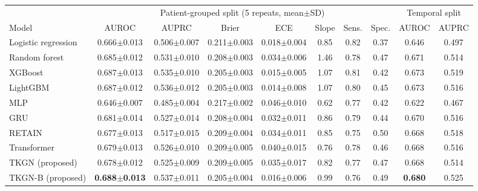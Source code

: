 \begin{tabular}{@{}lccccccc|cc@{}}
\toprule
 & \multicolumn{7}{c|}{Patient-grouped split (5 repeats, mean$\pm$SD)} & \multicolumn{2}{c}{Temporal split} \\
Model & AUROC & AUPRC & Brier & ECE & Slope & Sens. & Spec. & AUROC & AUPRC \\
\midrule
Logistic regression & 0.666$\pm$0.013 & 0.506$\pm$0.007 & 0.211$\pm$0.003 & 0.018$\pm$0.004 & 0.85 & 0.82 & 0.37 & 0.646 & 0.497 \\
Random forest & 0.685$\pm$0.012 & 0.531$\pm$0.010 & 0.208$\pm$0.003 & 0.034$\pm$0.006 & 1.46 & 0.78 & 0.47 & 0.671 & 0.514 \\
XGBoost & 0.687$\pm$0.013 & 0.535$\pm$0.010 & 0.205$\pm$0.003 & 0.015$\pm$0.005 & 1.07 & 0.81 & 0.42 & 0.673 & 0.519 \\
LightGBM & 0.687$\pm$0.012 & 0.536$\pm$0.012 & 0.205$\pm$0.003 & 0.014$\pm$0.008 & 1.07 & 0.80 & 0.45 & 0.673 & 0.516 \\
MLP & 0.646$\pm$0.007 & 0.485$\pm$0.004 & 0.217$\pm$0.002 & 0.046$\pm$0.010 & 0.62 & 0.77 & 0.42 & 0.622 & 0.467 \\
\midrule
GRU & 0.681$\pm$0.014 & 0.527$\pm$0.014 & 0.208$\pm$0.004 & 0.032$\pm$0.011 & 0.86 & 0.79 & 0.44 & 0.670 & 0.516 \\
RETAIN & 0.677$\pm$0.013 & 0.517$\pm$0.015 & 0.209$\pm$0.004 & 0.034$\pm$0.011 & 0.85 & 0.75 & 0.50 & 0.668 & 0.518 \\
Transformer & 0.679$\pm$0.013 & 0.526$\pm$0.010 & 0.209$\pm$0.005 & 0.040$\pm$0.015 & 0.76 & 0.78 & 0.46 & 0.668 & 0.516 \\
\midrule
TKGN (proposed) & 0.678$\pm$0.012 & 0.525$\pm$0.009 & 0.209$\pm$0.005 & 0.035$\pm$0.017 & 0.82 & 0.77 & 0.47 & 0.668 & 0.514 \\
TKGN-B (proposed) & \textbf{0.688$\pm$0.013} & 0.537$\pm$0.011 & 0.205$\pm$0.004 & 0.016$\pm$0.006 & 0.99 & 0.76 & 0.49 & \textbf{0.680} & 0.525 \\
\bottomrule
\end{tabular}
